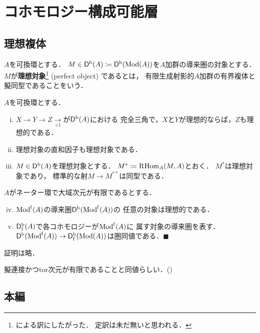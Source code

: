 \section{コホモロジー構成可能層}
\subsection{理想複体}
\(A\)を可換環とする．
\(M\in\mathop{\mathsf{D}^\mathrm{b}}\nolimits(A)\coloneqq \mathop{\mathsf{D}^\mathrm{b}}\nolimits(\mathop{\mathrm{Mod}}\nolimits(A))\)を\(A\)加群の導来圏の対象とする．
\(M\)が\textbf{理想対象}\footnote{
    \cite{Ue}による訳にしたがった．
    定訳は未だ無いと思われる．
} (perfect object) であるとは，
有限生成射影的\(A\)加群の有界複体と擬同型であることをいう．

\begin{PRP}[{\cite[Exercise I.30]{KS90}}]
    \(A\)を可換環とする．
    \begin{enumerate}[(i)]\setlength{\leftskip}{2zw}
        \item \(X\to Y\to Z\underset{+1}{\to}\)が\(\mathop{\mathsf{D}^\mathrm{b}}\nolimits(A)\)における
        完全三角で，\(X\)と\(Y\)が理想的ならば，\(Z\)も理想的である．
        \item 理想対象の直和因子も理想対象である．
        \item \(M\in\mathop{\mathsf{D}^\mathrm{b}}\nolimits(A)\)を理想対象とする．
        \(M^\ast\coloneqq \mathop{\mathrm{R}\hspace{-1.5pt}\mathop{\mathrm{Hom}}\nolimits}\nolimits_A(M,A)\)とおく．
        \(M^\ast\)は理想対象であり，
        標準的な射\(M\to M^{\ast\ast}\)は同型である．
    \end{enumerate}

    \(A\)がネーター環で大域次元が有限であるとする．
    \begin{enumerate}[(i)]\setcounter{enumi}{3}\setlength{\leftskip}{2zw}
        \item \(\mathop{\mathrm{Mod}^\mathrm{f}}\nolimits(A)\)の導来圏\(\mathop{\mathsf{D}^\mathrm{b}}\nolimits(\mathop{\mathrm{Mod}^\mathrm{f}}\nolimits(A))\)の
        任意の対象は理想的である．
        \item \(\mathop{\mathsf{D}_\mathrm{f}^\mathrm{b}}\nolimits(A)\)で各コホモロジーが\(\mathop{\mathrm{Mod}^\mathrm{f}}\nolimits(A)\)に
        属す対象の導来圏を表す．
        \(\mathop{\mathsf{D}^\mathrm{b}}\nolimits(\mathop{\mathrm{Mod}^\mathrm{f}}\nolimits(A))\to\mathop{\mathsf{D}_\mathrm{f}^\mathrm{b}}\nolimits(\mathop{\mathrm{Mod}}\nolimits(A))\)は圏同値である．\(\blacksquare\)
    \end{enumerate}
\end{PRP}   
証明は略．

擬連接かつtor次元が有限であることと同値らしい．(\cite[lem 15.74.2]{SP})

\subsection{本編}

